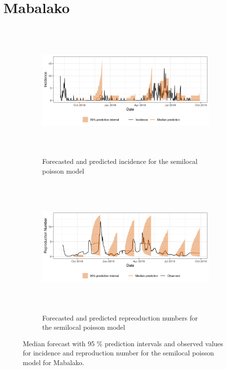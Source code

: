  \section{ Mabalako }\begin{figure}[H]\begin{subfigure}{\textwidth}  \centering  \includegraphics[width=0.9\linewidth, height=7cm]{../output/Mabalako_predictions.png}  \caption{Forecasted and predicted incidence for the semilocal poisson model}\end{subfigure}

\begin{subfigure}{\textwidth}  \centering  \includegraphics[width=0.9\linewidth, height=7cm]{../output/Mabalako_Rs.png}  \caption{Forecasted and predicted repreoduction numbers for the semilocal poisson model}\end{subfigure}  \caption{Median forecast with 95 \% prediction intervals and observed values for incidence and reproduction number for the semilocal poisson model for Mabalako.}\end{figure}

